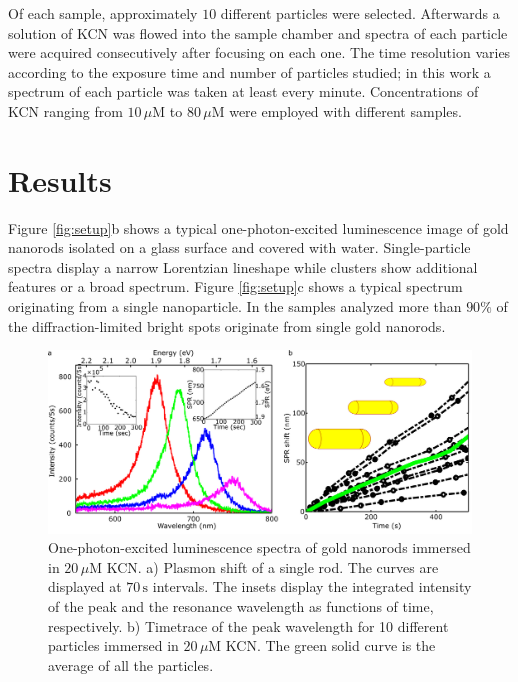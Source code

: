 \documentclass[twoside,twocolumn,11pt]{article}
\newcommand{\uM}{\ensuremath{\,\mu\textrm{M}}}
\begin{document}
Of each sample, approximately $10$ different particles were selected. Afterwards
a solution of KCN was flowed into the sample chamber and spectra of each
particle were acquired consecutively after focusing on each one. The time
resolution varies according to the exposure time and number of particles
studied; in this work a spectrum of each particle was taken at least every
minute. Concentrations of KCN ranging from $10\uM$ to $80\uM$ were employed with
different samples.

\section{Results}

Figure \ref{fig:setup}b shows a typical one-photon-excited luminescence image
of gold nanorods isolated on a glass surface and covered with water.
Single-particle spectra display a narrow Lorentzian lineshape\cite{Funston2009}
while clusters show additional features or a broad spectrum. Figure
\ref{fig:setup}c shows a typical spectrum originating from a single
nanoparticle. In the samples analyzed more than $90\%$ of the
diffraction-limited bright spots originate from single gold nanorods. 

\begin{figure}[htp]
 \centering
 \includegraphics[width=\textwidth]{Figures/02_Experimental/Experimental.png}
 \caption{One-photon-excited luminescence spectra of gold nanorods immersed in
 $20\uM$ KCN. a) Plasmon shift of a single rod. The curves are displayed at
 $70\,\text{s}$ intervals. The insets display the integrated intensity of the
 peak and the resonance wavelength as functions of time, respectively. b)
 Timetrace of the peak wavelength for 10 different particles immersed in
 $20\uM$ KCN. The green solid curve is the average of all the particles.}
 \label{fig:plasmon_single_rod}
\end{figure}
\end{document}

